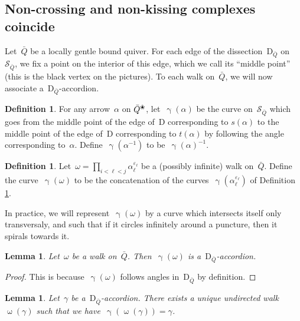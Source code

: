 \documentclass{amsart}
\newtheorem{lemma}[theorem]{Lemma}
\theoremstyle{definition}
\newtheorem{definition}[theorem]{Definition}
\newcommand{\blossom}{^\text{\ding{96}}} %
\newcommand{\walk}{\operatorname{\omega}} %
\newcommand{\surface}{\mathcal{S}} %
\newcommand{\dissection}{\mathrm{D}} %
\newcommand{\curveof}{\operatorname{\gamma}} %
\begin{document}
\subsection{Non-crossing and non-kissing complexes coincide}

Let~$\bar Q$ be a locally gentle bound quiver.
For each edge of the dissection~$\dissection_{\bar Q}$ on~$\surface_{\bar Q}$, we fix a point on the interior of this edge, which we call its ``middle point'' (this is the black vertex on the pictures).
To each walk on~$\bar Q$, we will now associate a~$\dissection_{\bar Q}$-accordion.

\begin{definition}
\label{def:curveOfAnArrow}
For any arrow~$\alpha$ on $\bar Q\blossom$, let~$\curveof(\alpha)$ be the curve on~$\surface_{\bar Q}$ which goes from the middle point of the edge of~$\dissection$ corresponding to $s(\alpha)$ to the middle point of the edge of~$\dissection$ corresponding to $t(\alpha)$ by following the angle corresponding to~$\alpha$.
Define~$\curveof(\alpha^{-1})$ to be~$\curveof(\alpha)^{-1}$.
\end{definition}

\begin{definition}
\label{def:curveOfAWalk}
Let~$\omega = \prod_{i < \ell < j} \alpha_\ell^{\varepsilon_\ell}$ be a (possibly infinite) walk on~$\bar Q$. 
Define the curve~$\curveof(\omega)$ to be the concatenation of the curves~$\curveof(\alpha_\ell^{\varepsilon_\ell})$ of Definition \ref{def:curveOfAnArrow}.
\end{definition}

In practice, we will represent~$\curveof(\omega)$ by a curve which intersects itself only transversaly, and such that if it circles infinitely around a puncture, then it spirals towards it.

\begin{lemma}
\label{lemm:curveOfAWalkIsAccordion}
Let~$\omega$ be a walk on~$\bar Q$.  Then~$\curveof(\omega)$ is a~$\dissection_{\bar Q}$-accordion.
\end{lemma}

\begin{proof}
This is because~$\curveof(\omega)$ follows angles in~$\dissection_{\bar Q}$ by definition.
\end{proof}

\begin{lemma}
\label{lemm:accordionsAreCurvesOfWalks}
Let~$\gamma$ be a~$\dissection_{\bar Q}$-accordion.  There exists a unique undirected walk~$\walk(\gamma)$ such that we have~$\curveof(\walk(\gamma)) = \gamma$.
\end{lemma}
\end{document}
